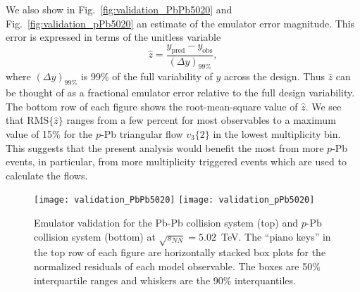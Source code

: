 \documentclass[aps,prc,reprint,amsmath,nofootinbib]{revtex4-1}
\newcommand{\sqrts}{\sqrt{s_{NN}}}
\newenvironment{fullpage}{\onecolumngrid}{\clearpage\twocolumngrid}
\begin{document}
We also show in Fig.~\ref{fig:validation_PbPb5020} and Fig.~\ref{fig:validation_pPb5020} an estimate of the emulator error magnitude.
This error is expressed in terms of the unitless variable
\begin{equation}
  \hat{z} = \frac{y_\text{pred} - y_\text{obs}}{(\Delta y)_{99\%}},
\end{equation}
where $(\Delta y)_{99\%}$ is 99\% of the full variability of $y$ across the design.
Thus $\hat{z}$ can be thought of as a fractional emulator error relative to the full design variability.
The bottom row of each figure shows the root-mean-square value of $\hat{z}$.
We see that $\text{RMS}\{\hat{z}\}$ ranges from a few percent for most observables to a maximum value of 15\% for the $p$-Pb triangular flow $v_3\{2\}$ in the lowest multiplicity bin.
This suggests that the present analysis would benefit the most from more $p$-Pb events, in particular, from more multiplicity triggered events which are used to calculate the flows.

\begin{fullpage}
\begin{figure}
  \texttt{[image: validation\_PbPb5020]}
  \texttt{[image: validation\_pPb5020]}
  \caption{\label{fig:val_pbpb} Emulator validation for the Pb-Pb collision system (top) and $p$-Pb collision system (bottom) at $\sqrts=5.02$~TeV. The ``piano keys'' in the top row of each figure are horizontally stacked box plots for the normalized residuals of each model observable. The boxes are 50\% interquartile ranges and whiskers are the 90\% interquantiles.}
\end{figure}
\end{fullpage}
\end{document}
